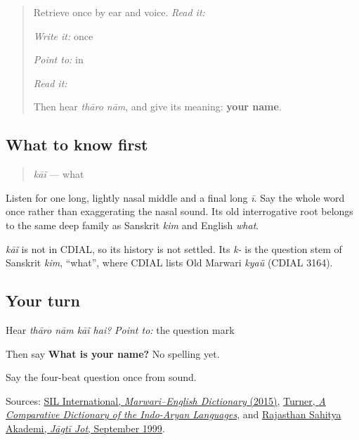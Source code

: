 \label{lesson:MW-C05-hear-kain}



\begin{quote}
Retrieve \textbf{ } once by ear and voice. \emph{Read it:} \textbf{ }

\emph{Write it:} \textbf{ } once

\emph{Point to:} \textbf{} in \textbf{}

\emph{Read it:} \textbf{}

Then hear \emph{thāro nām}, and give its meaning: \textbf{your name}.
\end{quote}

\subsection*{What to know first}
\begin{quote}
\emph{kāĩ} — what
\end{quote}

Listen for one long, lightly nasal middle and a final long \emph{ī}. Say the whole word once rather than exaggerating the nasal sound. Its old interrogative root belongs to the same deep family as Sanskrit \emph{kim} and English \emph{what}.

\begin{cousinweb}
\emph{kāĩ} is not in CDIAL, so its history is not settled. Its \emph{k-} is the question stem of Sanskrit \emph{kim}, \textquotedblleft{}what\textquotedblright{}, where CDIAL lists Old Marwari \emph{kyaü} (CDIAL 3164).
\end{cousinweb}

\subsection*{Your turn}
Hear \emph{thāro nām kāĩ hai?} \emph{Point to:} the question mark

Then say \textbf{What is your name?} No spelling yet.

\begin{tcolorbox}[breakable,colback=teal!4,colframe=teal!35!black,title={Before you move on}]
Say the four-beat question once from sound.

Sources: \href{https://nepal.sil.org/resources/archives/63768}{SIL International, \emph{Marwari–English Dictionary} (2015)}, \href{https://dsal.uchicago.edu/dictionaries/soas/}{Turner, \emph{A Comparative Dictionary of the Indo-Aryan Languages}}, and \href{https://rsad.artandculture.rajasthan.gov.in/content/dam/doitassets/art-and-culture/Rajasthani-Bhasha-Sahitya-Avm-Sanskriti-Academy-Bikaner/pdf/jjpdf/JJ\_28\_06\_06\_September\_to\_September\_1999.pdf}{Rajasthan Sahitya Akademi, \emph{Jāgtī Jot}, September 1999}.
\end{tcolorbox}
